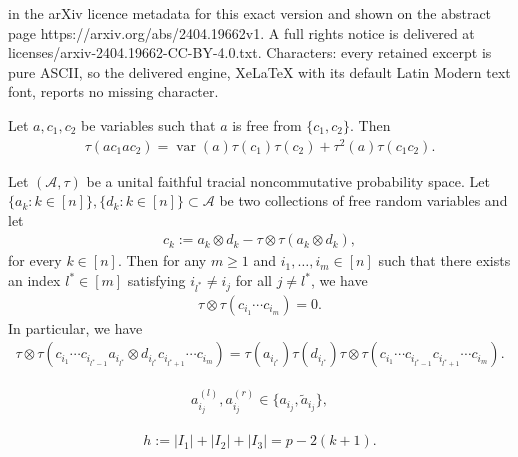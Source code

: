 \documentclass[10pt,a4paper]{amsart}
\newcommand{\A}{\mathcal{A}}
\newcommand{\var}{\operatorname{var}}
\begin{document}
in the arXiv licence metadata for this exact version and shown on the abstract page https://arxiv.org/abs/2404.19662v1. A full rights notice is delivered at licenses/arxiv-2404.19662-CC-BY-4.0.txt. Characters: every retained excerpt is pure ASCII, so the delivered engine, XeLaTeX with its default Latin Modern text font, reports no missing character.
\begin{lemma}\label{lemma: contribution of ac1ac2}
    Let $a,c_1,c_2$ be variables such that $a$ is free from $\{c_1,c_2\}$. Then
    \begin{align*}
        \tau(ac_1ac_2)=\var(a)\tau(c_1)\tau(c_2)+\tau^2(a)\tau(c_1c_2).
    \end{align*}
\end{lemma}

\begin{lemma}\label{lemma: centering}
    Let $(\A,\tau)$ be a unital faithful tracial noncommutative probability space. Let $\{a_k: k \in [n]\},\{d_k: k \in [n]\} \subset \A$ be two collections of free random variables and let
    \begin{align*}
        c_k:=a_k\otimes d_k-\tau\otimes \tau(a_k\otimes d_k),
    \end{align*}
    for every $k\in[n]$. Then for any $m \ge 1$ and $i_1,\ldots,i_m \in [n]$ such that there exists an index $l^* \in [m]$ satisfying $i_{l^*} \ne i_j$ for all $j \ne l^*$, we have
    \begin{align*}
        \tau\otimes \tau(c_{i_1}\cdots c_{i_{m}})=0.
    \end{align*}
    In particular, we have
    \begin{align*}
        \tau\otimes \tau\left(c_{i_1}\cdots c_{i_{l^*-1}}a_{i_{l^*}}\otimes d_{i_{l^*}} c_{i_{l^*+1}}\cdots c_{i_m} \right)=\tau(a_{i_{l^*}})\tau(d_{i_{l^*}})\tau\otimes \tau(c_{i_1}\cdots c_{i_{l^*-1}} c_{i_{l^*+1}}\cdots c_{i_m}).
    \end{align*}
\end{lemma}

\begin{align}\label{equation: a_j is either a or tilde a}
    a_{i_j}^{(l)},a_{i_j}^{(r)} \in \{a_{i_j},\tilde{a}_{i_j}\},
\end{align}

\begin{align}\label{eq: power of delta}
    h:=|I_1|+|I_2|+|I_3|=p-2(k+1).
\end{align}
\end{document}
